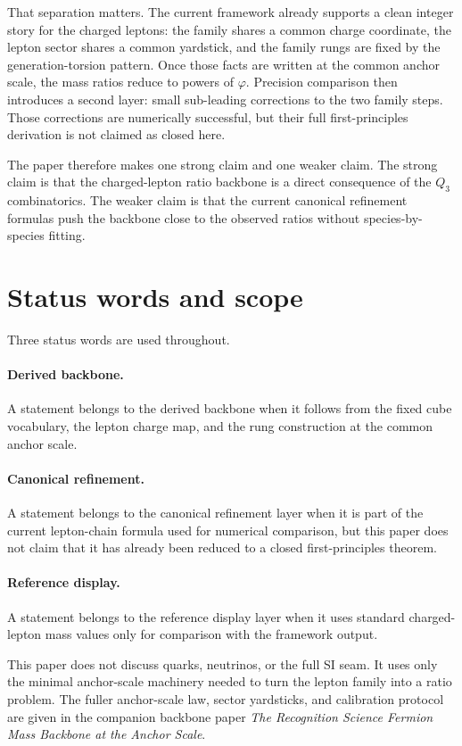 \documentclass[11pt]{article}
\newcommand{\phig}{\varphi}
\begin{document}
That separation matters. The current framework already supports a clean integer story for the charged leptons: the family shares a common charge coordinate, the lepton sector shares a common yardstick, and the family rungs are fixed by the generation-torsion pattern. Once those facts are written at the common anchor scale, the mass ratios reduce to powers of \(\phig\). Precision comparison then introduces a second layer: small sub-leading corrections to the two family steps. Those corrections are numerically successful, but their full first-principles derivation is not claimed as closed here.

The paper therefore makes one strong claim and one weaker claim. The strong claim is that the charged-lepton ratio backbone is a direct consequence of the \(Q_3\) combinatorics. The weaker claim is that the current canonical refinement formulas push the backbone close to the observed ratios without species-by-species fitting.

\section{Status words and scope}

Three status words are used throughout.

\paragraph{Derived backbone.} A statement belongs to the derived backbone when it follows from the fixed cube vocabulary, the lepton charge map, and the rung construction at the common anchor scale.

\paragraph{Canonical refinement.} A statement belongs to the canonical refinement layer when it is part of the current lepton-chain formula used for numerical comparison, but this paper does not claim that it has already been reduced to a closed first-principles theorem.

\paragraph{Reference display.} A statement belongs to the reference display layer when it uses standard charged-lepton mass values only for comparison with the framework output.

This paper does not discuss quarks, neutrinos, or the full SI seam. It uses only the minimal anchor-scale machinery needed to turn the lepton family into a ratio problem. The fuller anchor-scale law, sector yardsticks, and calibration protocol are given in the companion backbone paper \emph{The Recognition Science Fermion Mass Backbone at the Anchor Scale}.
\end{document}
